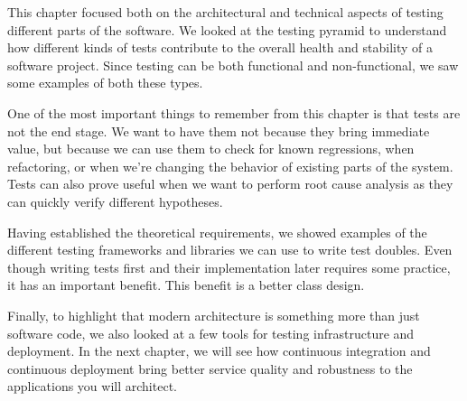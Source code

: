 This chapter focused both on the architectural and technical aspects of testing different parts of the software. We looked at the testing pyramid to understand how different kinds of tests contribute to the overall health and stability of a software project. Since testing can be both functional and non-functional, we saw some examples of both these types.

One of the most important things to remember from this chapter is that tests are not the end stage. We want to have them not because they bring immediate value, but because we can use them to check for known regressions, when refactoring, or when we're changing the behavior of existing parts of the system. Tests can also prove useful when we want to perform root cause analysis as they can quickly verify different hypotheses.

Having established the theoretical requirements, we showed examples of the different testing frameworks and libraries we can use to write test doubles. Even though writing tests first and their implementation later requires some practice, it has an important benefit. This benefit is a better class design.

Finally, to highlight that modern architecture is something more than just software code, we also looked at a few tools for testing infrastructure and deployment. In the next chapter, we will see how continuous integration and continuous deployment bring better service quality and robustness to the applications you will architect.

